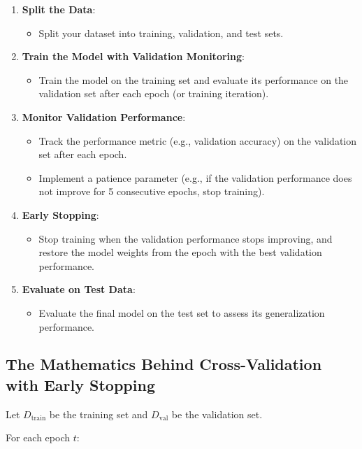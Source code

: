 \documentclass[10pt]{article}
\begin{document}
\begin{enumerate}
    \item \textbf{Split the Data}:
    \begin{itemize}
        \item Split your dataset into training, validation, and test sets.
    \end{itemize}
    \item \textbf{Train the Model with Validation Monitoring}:
    \begin{itemize}
        \item Train the model on the training set and evaluate its performance on the validation set after each epoch (or training iteration).
    \end{itemize}
    \item \textbf{Monitor Validation Performance}:
    \begin{itemize}
        \item Track the performance metric (e.g., validation accuracy) on the validation set after each epoch.
        \item Implement a patience parameter (e.g., if the validation performance does not improve for 5 consecutive epochs, stop training).
    \end{itemize}
    \item \textbf{Early Stopping}:
    \begin{itemize}
        \item Stop training when the validation performance stops improving, and restore the model weights from the epoch with the best validation performance.
    \end{itemize}
    \item \textbf{Evaluate on Test Data}:
    \begin{itemize}
        \item Evaluate the final model on the test set to assess its generalization performance.
    \end{itemize}
\end{enumerate}

\subsection{The Mathematics Behind Cross-Validation with Early Stopping}
Let \(D_{\text{train}}\) be the training set and \(D_{\text{val}}\) be the validation set.

For each epoch \(t\):
\end{document}
